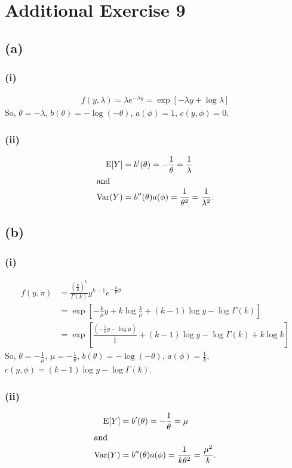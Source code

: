 \section*{Additional Exercise 9}
\subsection*{(a)}
\subsubsection*{(i)}
\begin{align*}
f(y,\lambda) = \lambda e^{-\lambda y} = \exp\left[-\lambda y +\log\lambda\right]
\end{align*}
So, $\theta = -\lambda$, $b(\theta) = -\log(-\theta)$, $a(\phi) = 1$, $c(y,\phi) = 0$.\\

\subsubsection*{(ii)}
\begin{align*}
\mathrm{E}[Y] &= b'(\theta) = -\frac{1}{\theta} = \frac{1}{\lambda}\\ \intertext{and}
\mathrm{Var}(Y) &= b''(\theta) a(\phi) = \frac{1}{\theta^{2}} = \frac{1}{\lambda^{2}}.
\end{align*}


\subsection*{(b)}
\subsubsection*{(i)}
\begin{align*}
f(y,\pi) &= \frac{\left(\frac{k}{\mu}\right)^{k}}{\Gamma(k)}y^{k-1}e^{-\frac{k}{\mu}y}\\
&= \exp\left[-\frac{k}{\mu}y +k\log\frac{k}{\mu} +(k-1)\log y -\log\Gamma(k)\right]\\
&= \exp\left[\frac{\left(-\frac{1}{\mu}y -\log\mu\right)}{\frac{1}{k}} +(k-1)\log y -\log\Gamma(k) +k\log k\right]
\end{align*}
So, $\theta = -\frac{1}{\mu}$, $\mu = -\frac{1}{\theta}$, $b(\theta) = -\log(-\theta)$, $a(\phi) = \frac{1}{k}$, $c(y,\phi) = (k-1)\log y -\log\Gamma(k)$.\\

\subsubsection*{(ii)}
\begin{align*}
\mathrm{E}[Y] &= b'(\theta) = -\frac{1}{\theta} = \mu\\ \intertext{and}
\mathrm{Var}(Y) &= b''(\theta) a(\phi) = \frac{1}{k\theta^{2}} = \frac{\mu^{2}}{k}.
\end{align*}